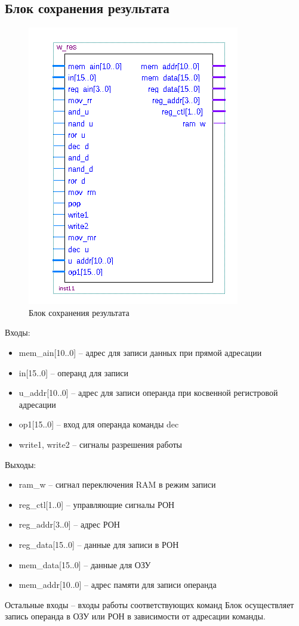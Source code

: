 \subsection{Блок сохранения результата}

\begin{figure}[ht]
\centering
    \includegraphics[scale=0.8]{wbc}
    \caption{Блок сохранения результата}
\end{figure}
Входы:
\begin{itemize}
    \item mem\_ain[10..0] -- адрес для записи данных при прямой адресации
    \item in[15..0] -- операнд для записи
    \item u\_addr[10..0] -- адрес для записи операнда при косвенной регистровой адресации
    \item op1[15..0] -- вход для операнда команды dec
    \item write1, write2 -- сигналы разрешения работы
\end{itemize}
Выходы:
\begin{itemize}
    \item ram\_w -- сигнал переключения RAM в режим записи
    \item reg\_ctl[1..0] -- управляющие сигналы РОН
    \item reg\_addr[3..0] -- адрес РОН
    \item reg\_data[15..0] -- данные для записи в РОН
    \item mem\_data[15..0] -- данные для ОЗУ
    \item mem\_addr[10..0] -- адрес памяти для записи операнда
\end{itemize}
Остальные входы -- входы работы соответствующих команд
Блок осуществляет запись операнда в ОЗУ или РОН в зависимости от адресации команды.

